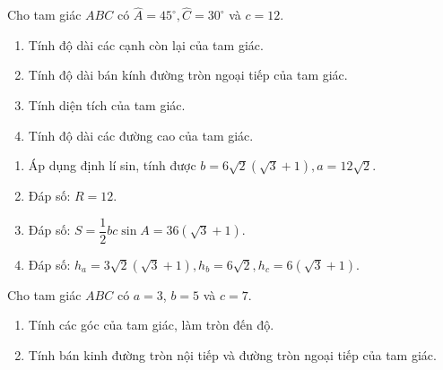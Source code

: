 \begin{bt}%
	Cho tam giác $ABC$ có $\widehat{A}=45^\circ,\widehat{C}=30^\circ$ và $c=12$.
	\begin{enumerate}
		\item Tính độ dài các cạnh còn lại của tam giác.
		\item Tính độ dài bán kính đường tròn ngoại tiếp của tam giác.
		\item Tính diện tích của tam giác.
		\item Tính độ dài các đường cao của tam giác.
	\end{enumerate}
	\loigiai
	{
	\begin{enumerate}
		\item Áp dụng định lí sin, tính được $b=6\sqrt{2}(\sqrt{3}+1), a=12\sqrt{2}$.
		\item Đáp số: $R=12$.
		\item Đáp số: $S=\dfrac{1}{2}b c\sin A=36(\sqrt{3}+1)$.
		\item Đáp số: $h_a=3\sqrt{2}(\sqrt{3}+1), h_b=6\sqrt{2}, h_c=6(\sqrt{3}+1)$.
	\end{enumerate}
	}
\end{bt}

\begin{bt}%
	Cho tam giác $ABC$ có $a = 3$, $b = 5$ và $c = 7$.
	\begin{enumerate}
		\item Tính các góc của tam giác, làm tròn đến độ.
		\item Tính bán kinh đường tròn nội tiếp và đường tròn ngoại tiếp của tam giác.
	\end{enumerate}
\end{bt}

